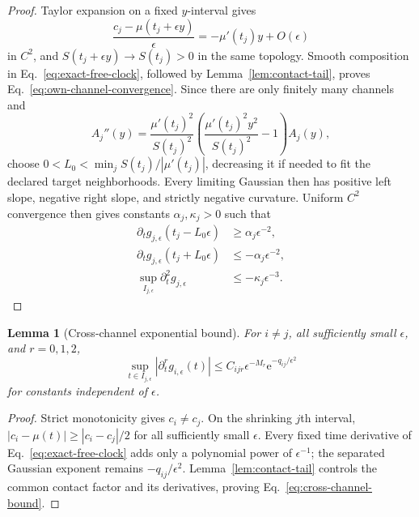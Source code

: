 \documentclass[aps,physrev,onecolumn,amsmath,amssymb,longbibliography]{revtex4-2}
\newcommand{\e}{\mathrm e}
\newtheorem{lemma}[theorem]{Lemma}
\begin{document}
\begin{proof}
Taylor expansion on a fixed \(y\)-interval gives
\begin{equation}
 \frac{c_j-\mu(t_j+\epsilon y)}{\epsilon}
 =-\mu'(t_j)y+O(\epsilon)
 \label{eq:mean-taylor}
\end{equation}
in \(C^2\), and \(S(t_j+\epsilon y)\to S(t_j)>0\) in the same topology.
Smooth composition in Eq.~\eqref{eq:exact-free-clock}, followed by
Lemma~\ref{lem:contact-tail}, proves
Eq.~\eqref{eq:own-channel-convergence}.  Since there are only finitely many
channels and
\begin{equation}
 A_j''(y)=\frac{\mu'(t_j)^2}{S(t_j)^2}
 \left(\frac{\mu'(t_j)^2y^2}{S(t_j)^2}-1\right)A_j(y),
 \label{eq:limiting-gaussian-curvature}
\end{equation}
choose
\(0<L_0<\min_j S(t_j)/|\mu'(t_j)|\), decreasing it if needed to fit the
declared target neighborhoods.  Every limiting Gaussian then has positive
left slope, negative right slope, and strictly negative curvature.  Uniform
\(C^2\) convergence then gives constants \(\alpha_j,\kappa_j>0\) such that
\begin{align}
 \partial_tg_{j,\epsilon}(t_j-L_0\epsilon)
 &\ge\alpha_j\epsilon^{-2},\nonumber\\
 \partial_tg_{j,\epsilon}(t_j+L_0\epsilon)
 &\le-\alpha_j\epsilon^{-2},\nonumber\\
 \sup_{I_{j,\epsilon}}\partial_t^2g_{j,\epsilon}
 &\le-\kappa_j\epsilon^{-3}.
 \label{eq:own-channel-margins}
\end{align}
\end{proof}

\begin{lemma}[Cross-channel exponential bound]
\label{lem:cross-channel}
For \(i\ne j\), all sufficiently small \(\epsilon\), and \(r=0,1,2\),
\begin{equation}
 \sup_{t\in I_{j,\epsilon}}
 |\partial_t^rg_{i,\epsilon}(t)|
 \le C_{ijr}\epsilon^{-M_r}\e^{-q_{ij}/\epsilon^2}
 \label{eq:cross-channel-bound}
\end{equation}
for constants independent of \(\epsilon\).
\end{lemma}

\begin{proof}
Strict monotonicity gives \(c_i\ne c_j\).  On the shrinking \(j\)th interval,
\(|c_i-\mu(t)|\ge|c_i-c_j|/2\) for all sufficiently small \(\epsilon\).
Every fixed time derivative of Eq.~\eqref{eq:exact-free-clock} adds only a
polynomial power of \(\epsilon^{-1}\); the separated Gaussian exponent remains
\(-q_{ij}/\epsilon^2\).  Lemma~\ref{lem:contact-tail} controls the common
contact factor and its derivatives, proving Eq.~\eqref{eq:cross-channel-bound}.
\end{proof}
\end{document}
